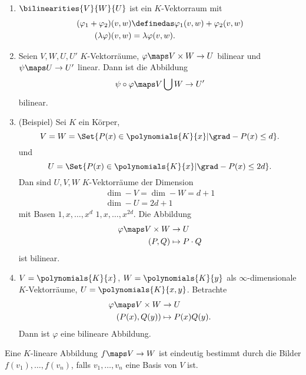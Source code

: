 \begin{bemerkungen*}
  \begin{enumerate}
    \item \( \bilinearities{V}{W}{U} \) ist ein \( K \)-Vektorraum mit
    \begin{align*}
      (\varphi_1+\varphi_2)(v,w)&\definedas \varphi_1(v,w)+\varphi_2(v,w)\\
      (\lambda \varphi)(v,w)&=\lambda \varphi(v,w).
    \end{align*}
    \item Seien \( V,W,U,U'\) \( K \)-Vektorräume, \( \varphi\maps V\times W\to U \) bilinear und \( \psi\maps U\to U' \) linear. Dann ist die Abbildung 
    \begin{equation*}
      \psi\circ \varphi\maps V\bigcup W\to U'
    \end{equation*}
    bilinear.
    \item \label{bilinearitaet_beispiel} (Beispiel) Sei \( K \) ein Körper,
    \begin{equation*}
      V=W=\Set{P(x)\in \polynomials{K}{x}|\grad-{P(x)}\leq d}.
    \end{equation*}
    und
    \begin{equation*}
      U=\Set{P(x)\in \polynomials{K}{x}|\grad-{P(x)}\leq 2d}.
    \end{equation*}
    Dan sind \( U,V,W \) \( K \)-Vektorräume der Dimension
    \begin{gather*}
      \dim-{V}=\dim-{W}=d+1\\
      \dim-{U}=2d+1
    \end{gather*}
    mit Basen \( 1,x,\dotsc,x^d \) \bzw \( 1,x,\dotsc,x^{2d} \). Die Abbildung
    \begin{align*}
      \varphi\maps V\times W&\to U\\
      (P,Q)&\mapsto P\cdot Q
    \end{align*}
    ist bilinear.
    \item \( V=\polynomials{K}{x} \), \( W=\polynomials{K}{y} \) als \( \infty \)-dimensionale \( K \)-Vektorräume, \( U=\polynomials{K}{x,y} \). Betrachte
    \begin{align*}
      \varphi\maps V\times W&\to U\\
      (P(x),Q(y))&\mapsto P(x)Q(y).
    \end{align*}
    Dann ist \( \varphi \) eine bilineare Abbildung.
  \end{enumerate}
\end{bemerkungen*}
\begin{erinnerung*}
  Eine \( K \)-lineare Abbildung \( f\maps V\to W \) ist eindeutig bestimmt durch die Bilder \( f(v_1),\dotsc,f(v_n) \), falls \( v_1,\dotsc,v_n \) eine Basis von \( V \) ist.
\end{erinnerung*}
